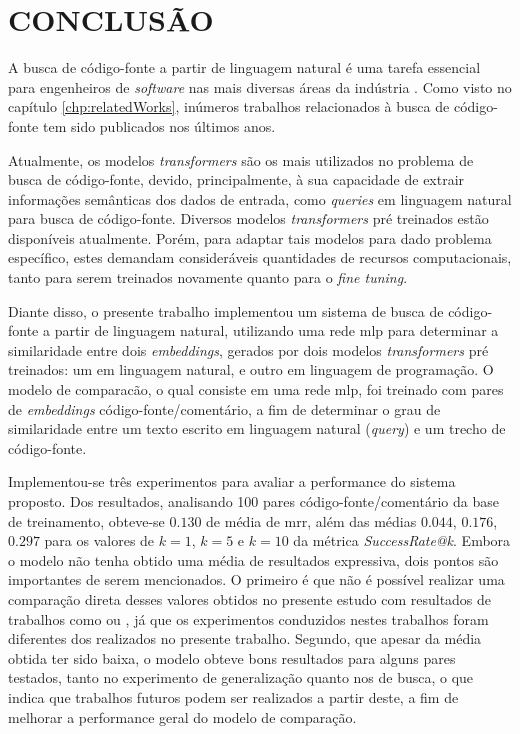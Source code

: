 \chapter{CONCLUSÃO}
\label{chp:conclusao}

A busca de código-fonte a partir de linguagem natural é uma tarefa essencial para engenheiros de \textit{software} nas mais diversas áreas da indústria \cite{Sadowski2015HowDS}. Como visto no capítulo \ref{chp:relatedWorks}, inúmeros trabalhos relacionados à busca de código-fonte tem sido publicados nos últimos anos. 

Atualmente, os modelos \textit{transformers} são os mais utilizados no problema de busca de código-fonte, devido, principalmente, à sua capacidade de extrair informações semânticas dos dados de entrada, como \textit{queries} em linguagem natural para busca de código-fonte. Diversos modelos \textit{transformers} pré treinados estão disponíveis atualmente. Porém, para adaptar tais modelos para dado problema específico, estes demandam consideráveis quantidades de recursos computacionais, tanto para serem treinados novamente quanto para o \textit{fine tuning}. 

Diante disso, o presente trabalho implementou um sistema de busca de código-fonte a partir de linguagem natural, utilizando uma rede \gls{mlp} para determinar a similaridade entre dois \textit{embeddings}, gerados por dois modelos \textit{transformers} pré treinados: um em linguagem natural, e outro em linguagem de programação. O modelo de comparacão, o qual consiste em uma rede \gls{mlp}, foi treinado com pares de \textit{embeddings} código-fonte/comentário, a fim de determinar o grau de similaridade entre um texto escrito em linguagem natural (\textit{query}) e um trecho de código-fonte.

Implementou-se três experimentos para avaliar a performance do sistema proposto. Dos resultados, analisando 100 pares código-fonte/comentário da base de treinamento, obteve-se $0.130$ de média de \gls{mrr}, além das médias $0.044$, $0.176$, $0.297$ para os valores de $k=1$, $k=5$ e $k=10$ da métrica \textit{SuccessRate@k}. Embora o modelo não tenha obtido uma média de resultados expressiva, dois pontos são importantes de serem mencionados. O primeiro é que não é possível realizar uma comparação direta desses valores obtidos no presente estudo com resultados de trabalhos como \textcite{Gu2018DeepCS} ou \textcite{Gu2021CRaDLeDC}, já que os experimentos conduzidos nestes trabalhos foram diferentes dos realizados no presente trabalho. Segundo, que apesar da média obtida ter sido baixa, o modelo obteve bons resultados para alguns pares testados, tanto no experimento de generalização quanto nos de busca, o que indica que trabalhos futuros podem ser realizados a partir deste, a fim de melhorar a performance geral do modelo de comparação.
